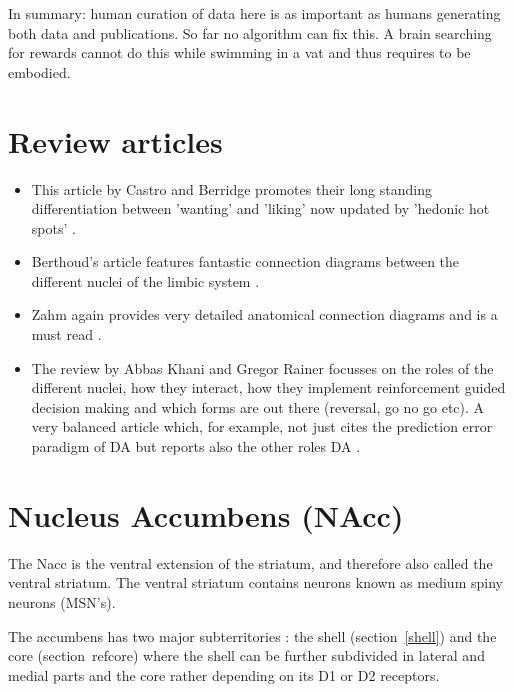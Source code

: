 \documentclass[12pt,a4paper]{article}
\begin{document}
In summary: human curation of data here is as important as humans
generating both data and publications. So far no algorithm can
fix this. A brain searching for rewards cannot do this while swimming
in a vat and thus requires to be embodied.





\section{Review articles}
\begin{itemize}
\item This article by Castro and Berridge promotes their long standing
  differentiation between 'wanting' and 'liking' \citep{Berridge2009}
  now updated by 'hedonic hot spots' \citep{Castro2015}.
\item Berthoud's article features fantastic connection diagrams
  between the different nuclei of the limbic system
  \citep{Berthoud04}.
\item Zahm again provides very detailed anatomical connection diagrams
  and is a must read \citep{Zahm00}.
\item The review by Abbas Khani and Gregor Rainer focusses on the
  roles of the different nuclei, how they interact, how they implement
  reinforcement guided decision making and which forms are out there
  (reversal, go no go etc). A very balanced article which, for
  example, not just cites the prediction error paradigm of DA but
  reports also the other roles DA \citep{Khani2016}.
\end{itemize}










\section{Nucleus Accumbens (NAcc)\label{nacc}}
The Nacc is the ventral extension of the striatum, and therefore also
called the ventral striatum.  The ventral striatum contains neurons
known as medium spiny neurons (MSN's).

The accumbens has two major subterritories \citep{heimer91}: the shell
(section~\ref{shell}) and the core (section~ref{core})
where the shell can be further subdivided
\citep{Usuda1998} in lateral and medial parts and the core rather
depending on its D1 or D2 receptors.
\end{document}
